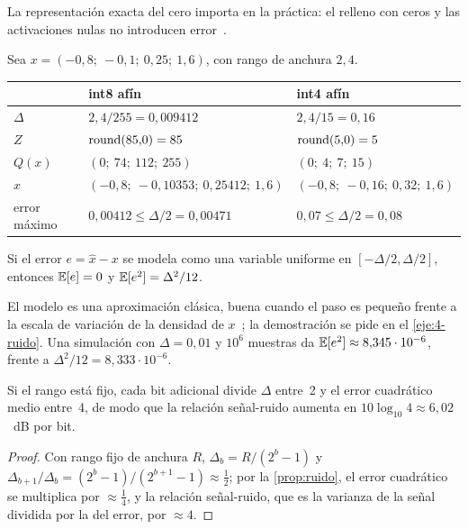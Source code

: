 La representación exacta del cero importa en la práctica: el relleno con ceros y las activaciones nulas no introducen error~\cite{jacob}.

\begin{ejemplo}\label{ej:cuant}
Sea $x=(-0{,}8;\allowbreak\ -0{,}1;\allowbreak\ 0{,}25;\allowbreak\ 1{,}6)$, con rango de anchura $2{,}4$.
\begin{center}\small
\begin{tabular}{@{}lll@{}}
\toprule
 & int8 afín & int4 afín \\
\midrule
$\Delta$ & $2{,}4/255=0{,}009412$ & $2{,}4/15=0{,}16$ \\
$Z$ & $\operatorname{round}(85{,}0)=85$ & $\operatorname{round}(5{,}0)=5$ \\
$Q(x)$ & $(0;\allowbreak\ 74;\allowbreak\ 112;\allowbreak\ 255)$ & $(0;\allowbreak\ 4;\allowbreak\ 7;\allowbreak\ 15)$ \\
$\hat x$ & $(-0{,}8;\allowbreak\ -0{,}10353;\allowbreak\ 0{,}25412;\allowbreak\ 1{,}6)$ & $(-0{,}8;\allowbreak\ -0{,}16;\allowbreak\ 0{,}32;\allowbreak\ 1{,}6)$ \\
error máximo & $0{,}00412\le\Delta/2=0{,}00471$ & $0{,}07\le\Delta/2=0{,}08$ \\
\bottomrule
\end{tabular}
\end{center}
\end{ejemplo}

\begin{proposicion}\label{prop:ruido}
Si el error $e=\hat x-x$ se modela como una variable uniforme en $[-\Delta/2,\Delta/2]$, entonces $\mathbb{E}[e]=0$ y $\mathbb{E}[e^{2}]=\Delta^{2}/12$.
\end{proposicion}

El modelo es una aproximación clásica, buena cuando el paso es pequeño frente a la escala de variación de la densidad de $x$~\cite{grayneuhoff}; la demostración se pide en el \cref{eje:4-ruido}. Una simulación con $\Delta=0{,}01$ y $10^{6}$ muestras da $\mathbb{E}[e^{2}]\approx 8{,}345\cdot 10^{-6}$, frente a $\Delta^{2}/12=8{,}333\cdot 10^{-6}$.

\begin{corolario}\label{cor:6db}
Si el rango está fijo, cada bit adicional divide $\Delta$ entre~2 y el error cuadrático medio entre~4, de modo que la relación señal-ruido aumenta en $10\log_{10}4\approx 6{,}02$~dB por bit.
\end{corolario}

\begin{proof}
Con rango fijo de anchura $R$, $\Delta_b=R/(2^{b}-1)$ y $\Delta_{b+1}/\Delta_b=(2^{b}-1)/(2^{b+1}-1)\approx\frac12$; por la \cref{prop:ruido}, el error cuadrático se multiplica por $\approx\frac14$, y la relación señal-ruido, que es la varianza de la señal dividida por la del error, por $\approx 4$.
\end{proof}

